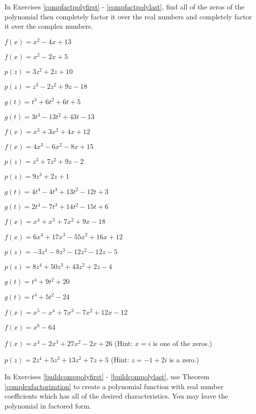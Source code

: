 \startexenum

In Exercises \ref{compfactpolyfirst} - \ref{compfactpolylast}, find all of the zeros of the polynomial then completely factor it over the real numbers and completely factor it over the complex numbers.

\begin{shortexenum}[$g(t) = 3t^{3} - 13t^{2} + 43t - 13$]
\item $f(x) = x^{2} - 4x + 13$ \label{compfactpolyfirst}
\item $f(x) = x^2 - 2x + 5$
\item $p(z) = 3z^{2} + 2z + 10$
\item $p(z) = z^3-2z^2+9z-18$
\item $g(t) = t^{3} + 6t^{2} + 6t + 5$
\item $g(t) = 3t^{3} - 13t^{2} + 43t - 13$
\item $f(x) = x^3 + 3x^2 + 4x + 12$
\item $f(x) = 4x^3-6x^2-8x+15$
\item  $p(z) = z^3 + 7z^2+9z-2$
\item  $p(z) = 9z^3+2z+1$
\item $g(t) = 4t^{4} - 4t^{3} + 13t^{2} - 12t + 3$
\item $g(t) = 2t^4-7t^3+14t^2-15t+6$
\item  $f(x) = x^4+x^3+7x^2+9x-18$
\item  $f(x) = 6x^4+17x^3-55x^2+16x+12$
\item  $p(z) = -3z^4-8z^3-12z^2-12z-5$
\item  $p(z) = 8z^4+50z^3+43z^2+2z-4$
\item $g(t) = t^4+9t^2+20$
\item $g(t) = t^4 + 5t^2 - 24$
\item  $f(x) = x^5 - x^4+7x^3-7x^2+12x-12$
\item $f(x) = x^6-64$
\item $f(x) = x^{4} - 2x^{3} + 27x^{2} - 2x + 26$ (Hint: $x = i$ is one of the zeros.)
\item  $p(z) = 2z^4+5z^3+13z^2+7z+5$ (Hint:  $z = -1+2i$ is a zero.) \label{compfactpolylast}
\end{shortexenum}

In Exercises \ref{buildcomppolyfirst} - \ref{buildcompolylast}, use Theorem \ref{complexfactorization} to create a polynomial function with real number coefficients which has all of the desired characteristics.  You may leave the polynomial in factored form. 


